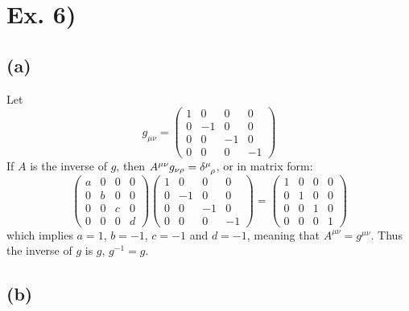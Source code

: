 \documentclass[oneside, 10pt, notitlepage]{book}
\begin{document}
\section*{Ex. 6)}

\subsection*{(a)}

Let
\begin{equation}
    g_{\mu\nu} = \begin{pmatrix}
    1 & 0 & 0 & 0 \\
    0 & -1 & 0 & 0 \\
    0 & 0 & -1 & 0 \\
    0 & 0 & 0 & -1
    \end{pmatrix}
\end{equation}
If \(A\) is the inverse of \(g\), then \(A^{\mu\nu}g_{\nu\rho} = \tensor{\delta}{^{\mu}_{\rho}}\), or in matrix form:
\begin{equation}
    \begin{pmatrix}
    a & 0 & 0 & 0 \\
    0 & b & 0 & 0 \\
    0 & 0 & c & 0 \\
    0 & 0 & 0 & d
    \end{pmatrix}
    \begin{pmatrix}
    1 & 0 & 0 & 0 \\
    0 & -1 & 0 & 0 \\
    0 & 0 & -1 & 0 \\
    0 & 0 & 0 & -1
    \end{pmatrix}=\begin{pmatrix}
    1 & 0 & 0 & 0 \\
    0 & 1 & 0 & 0 \\
    0 & 0 & 1 & 0 \\
    0 & 0 & 0 & 1
    \end{pmatrix}
\end{equation}
which implies \(a=1\), \(b=-1\), \(c=-1\) and \(d=-1\), meaning that \(A^{\mu\nu} = g^{\mu\nu} \). Thus the inverse of \(g\) is \(g\), \(g^{-1}=g\).

\subsection*{(b)}
\end{document}
